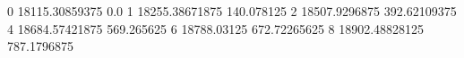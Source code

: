 0 18115.30859375 0.0
1 18255.38671875 140.078125
2 18507.9296875 392.62109375
4 18684.57421875 569.265625
6 18788.03125 672.72265625
8 18902.48828125 787.1796875
